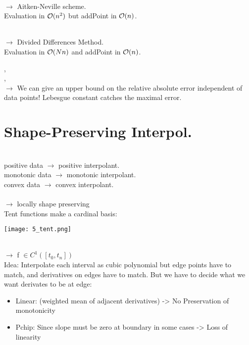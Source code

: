  \\
$\rightarrow$ Aitken-Neville scheme. \\
Evaluation in $\mathcal{O}(n^2)$ but addPoint in $\mathcal{O}(n)$.

 \\
$\rightarrow$ Divided Differences Method. \\
Evaluation in $\mathcal{O}(N n)$ and addPoint in $\mathcal{O}(n)$.

\sep
\Method[Extrapolation] \\

\sep
\Method[Sensitivity] \\
$\rightarrow$ We can give an upper bound on the relative absolute error independent of data points!
Lebesgue constant catches the maximal error.

\section{Shape-Preserving Interpol.}

 \\
positive data $\longrightarrow$ positive interpolant. \\
monotonic data $\longrightarrow$ monotonic interpolant.\\
convex data $\longrightarrow$ convex interpolant. \\

 \\
$\rightarrow$ locally shape preserving \\
Tent functions make a cardinal basis:
\begin{center}
\texttt{[image: 5\_tent.png]}
\end{center}

 \\
$\rightarrow$ f $\in C^{1}\left(\left[t_{0}, t_{n}\right]\right)$ \\
Idea: Interpolate each interval as cubic polynomial but edge points have to match, and derivatives on edges have to match. But we have to decide what we want derivates to be at edge:
\begin{itemize}
	\item Linear: (weighted mean of adjacent derivatives) -> No Preservation of monotonicity
	\item Pchip: Since slope must be zero at boundary in some cases -> Loss of linearity
\end{itemize}

